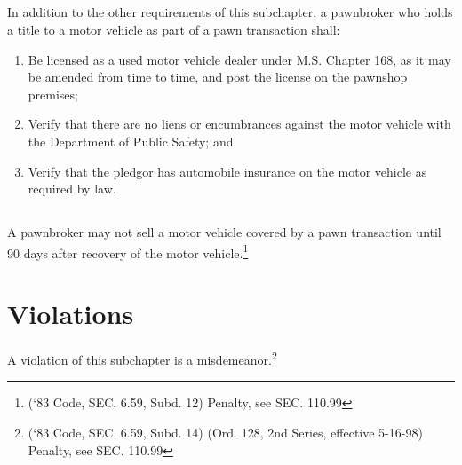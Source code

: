 \subsection{}
In addition to the other requirements of this subchapter, a pawnbroker who holds a title to a motor vehicle as part of a pawn transaction shall:
\begin{enumerate}[{\indent}1)]
    \item Be licensed as a used motor vehicle dealer under M.S. Chapter 168, as it may be amended from time to time, and post the license on the pawnshop premises;
    \item Verify that there are no liens or encumbrances against the motor vehicle with the Department of Public Safety; and
    \item Verify that the pledgor has automobile insurance on the motor vehicle as required by law.
\end{enumerate}
\subsection{}
A pawnbroker may not sell a motor vehicle covered by a pawn transaction until 90 days after recovery of the motor vehicle.\footnote{(‘83 Code, SEC. 6.59, Subd. 12)  Penalty, see SEC. 110.99}

\section{Violations}
A violation of this subchapter is a misdemeanor.\footnote{(‘83 Code, SEC. 6.59, Subd. 14)  (Ord. 128, 2nd Series, effective 5-16-98)  Penalty, see SEC. 110.99}
